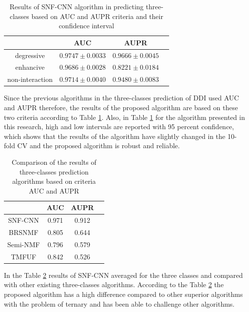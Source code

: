 \documentclass{bmcart}
\begin{document}
\begin{table}[h!]
\centering 
\begin{tabular}{|c|c|c|c|}
\hline
& AUC & AUPR\\
\hline
degressive	& $0.9747 \pm 0.0033$ & $0.9666 \pm 0.0045$\\
\hline
enhancive  & $0.9686 \pm 0.0028$ & $0.8221 \pm 0.0184$\\
\hline
non-interaction & $0.9714 \pm 0.0040$ & $0.9480 \pm 0.0083$\\
\hline
\end{tabular}
\newline
	\caption{Results of SNF-CNN algorithm in predicting three-classes based on AUC and AUPR criteria and their confidence interval}
	\label{SNF-CNNresult}
\end{table}

Since the previous algorithms in the three-classes prediction of DDI used AUC and AUPR therefore, the results of the proposed algorithm are based on these two criteria according to Table \ref{SNF-CNNresult}. Also, in Table \ref{SNF-CNNresult} for the algorithm presented in this research, high and low intervals are reported with 95 percent confidence, which shows that the results of the algorithm have slightly changed in the 10- fold CV and the proposed algorithm is robust and reliable.

\begin{table}[h!]
\centering 
\begin{tabular}{|c|c|c|c|}
\hline
& AUC	& AUPR \\
\hline
SNF-CNN	& 0.971 & 0.912\\
\hline
BRSNMF\cite{shi2019detecting}  & 0.805 & 0.644\\
\hline
Semi-NMF \cite{yu2018predicting} & 0.796 & 0.579\\
\hline
TMFUF\cite{shi2018tmfuf}   & 0.842  & 0.526\\
\hline
\end{tabular}
\newline 
	\caption{Comparison of the results of three-classes prediction algorithms based on criteria AUC and AUPR}
	\label{AUCAUPR}
\end{table}

In the Table \ref{AUCAUPR} results of SNF-CNN averaged for the three classes and compared with other existing three-classes algorithms. According to the Table \ref{AUCAUPR} the proposed algorithm has a high difference compared to other superior algorithms with the problem of ternary and has been able to challenge other algorithms.
\end{document}
